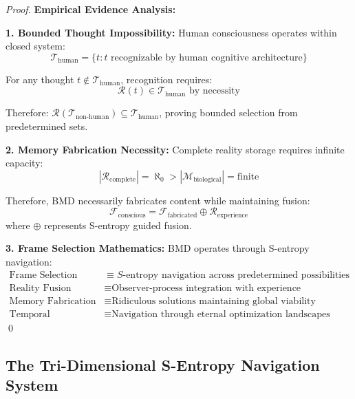 \documentclass[12pt,a4paper]{article}
\begin{document}
\begin{proof}
\textbf{Empirical Evidence Analysis:}

\textbf{1. Bounded Thought Impossibility:}
Human consciousness operates within closed system:
\begin{equation}
\mathcal{T}_{\text{human}} = \{t : t \text{ recognizable by human cognitive architecture}\}
\end{equation}

For any thought $t \notin \mathcal{T}_{\text{human}}$, recognition requires:
\begin{equation}
\mathcal{R}(t) \in \mathcal{T}_{\text{human}} \text{ by necessity}
\end{equation}

Therefore: $\mathcal{R}(\mathcal{T}_{\text{non-human}}) \subseteq \mathcal{T}_{\text{human}}$, proving bounded selection from predetermined sets.

\textbf{2. Memory Fabrication Necessity:}
Complete reality storage requires infinite capacity:
\begin{equation}
|\mathcal{R}_{\text{complete}}| = \aleph_0 > |\mathcal{M}_{\text{biological}}| = \text{finite}
\end{equation}

Therefore, BMD necessarily fabricates content while maintaining fusion:
\begin{equation}
\mathcal{F}_{\text{conscious}} = \mathcal{F}_{\text{fabricated}} \oplus \mathcal{R}_{\text{experience}}
\end{equation}
where $\oplus$ represents S-entropy guided fusion.

\textbf{3. Frame Selection Mathematics:}
BMD operates through S-entropy navigation:
\begin{align}
\text{Frame Selection} &\equiv S\text{-entropy navigation across predetermined possibilities} \\
\text{Reality Fusion} &\equiv \text{Observer-process integration with experience} \\
\text{Memory Fabrication} &\equiv \text{Ridiculous solutions maintaining global viability} \\
\text{Temporal Coherence} &\equiv \text{Navigation through eternal optimization landscapes}
\end{align}
\qed
\end{proof}

\subsection{The Tri-Dimensional S-Entropy Navigation System}
\end{document}
